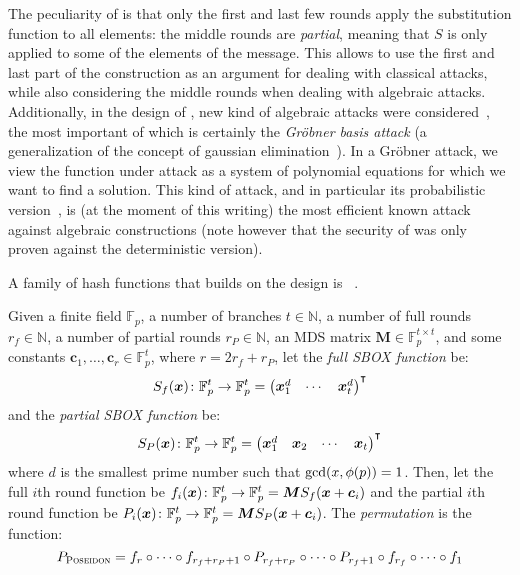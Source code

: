 The peculiarity of \Hades{} is that only the first and last few rounds apply the substitution
function to all elements: the middle rounds are \emph{partial}, meaning that \(S\) is only applied 
to some of the elements of the message.
This allows to use the first and last part of the construction as an argument for dealing with 
classical attacks, while also considering the middle rounds when dealing with algebraic attacks.
Additionally, in the design of \Hades{}, new kind of algebraic attacks were 
considered~\cite{BeyneEtAl2020}, the most important of which is certainly the 
\emph{Gr\"{o}bner basis attack} 
(a generalization of the concept of gaussian elimination~\cite{CoxLO2015,Lazard1983}).
In a Gr\"{o}bner attack, we view the function under attack as a system of polynomial equations 
for which we want to find a solution.
This kind of attack, and in particular its probabilistic version~\cite{FaugereGHR2014}, is 
(at the moment of this writing) the most efficient known attack against algebraic constructions 
(note however that the security of \Hades{} was only proven against the deterministic 
version).

A family of hash functions that builds on the \Hades{} design is \Poseidon~\cite{GrassiKRRS2021}.
\begin{definition}\label{def:poseidon}
  Given a finite field \(\mathbb{F}_p\), a number of branches \(t \in \mathbb{N}\), a number of 
  full rounds \(r_f \in \mathbb{N}\), a number of partial rounds \(r_{P} \in \mathbb{N}\), 
  an MDS matrix \(\bm{M} \in \mathbb{F}_{p}^{t \times t}\), and some constants 
  \(\bm{c}_{1}, \dots, \bm{c}_{r} \in \mathbb{F}_{p}^{t}\), where \(r = 2r_f + r_P\), let the 
  \emph{full SBOX function} be:
  \[
    \call{S_{f}}{\bm{x}}\colon \mathbb{F}_{p}^{t} \to \mathbb{F}_{p}^{t} = 
    {\begin{pmatrix}
      \bm{x}_{1}^{d} & \cdots & \bm{x}_{t}^{d}
    \end{pmatrix}}^{\transpose}
  \]
  and the \emph{partial SBOX function} be:
  \[
    \call{S_{P}}{\bm{x}}\colon \mathbb{F}_{p}^{t} \to \mathbb{F}_{p}^{t} = 
    {\begin{pmatrix}
      \bm{x}_{1}^{d} & \bm{x}_{2} & \cdots & \bm{x}_{t}
    \end{pmatrix}}^{\transpose}
  \]
  where \(d\) is the smallest prime number such that \(\call{\gcd}{x, \call{\totient}{p}} = 1\).
  Then, let the full \(i\)th round function be 
  \(\call{f_{i}}{\bm{x}}\colon \mathbb{F}_{p}^{t} \to \mathbb{F}_{p}^{t} = 
  \bm{M}\call{S_{f}}{\bm{x} + \bm{c}_{i}}\)
  and the partial \(i\)th round function be
  \(\call{P_{i}}{\bm{x}}\colon \mathbb{F}_{p}^{t} \to \mathbb{F}_{p}^{t} = 
  \bm{M}\call{S_{P}}{\bm{x} + \bm{c}_{i}}\).
  The \emph{\Poseidon{} permutation} is the function:
  \[
    P_{\textnormal{\textsc{Poseidon}}} = 
    f_{r} \circ \cdots \circ f_{r_f + r_P + 1} \circ 
    P_{r_f + r_P} \circ \cdots \circ P_{r_f + 1} \circ 
    f_{r_f} \circ \cdots \circ f_{1}
  \]
\end{definition}

